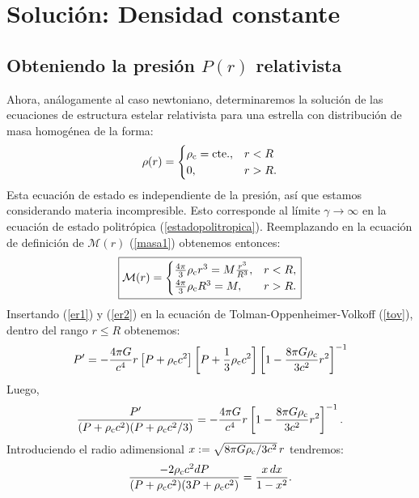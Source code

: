 \section{Solución: Densidad constante}

\subsection{Obteniendo la presión  \texorpdfstring{$P(r)$}{P(r)} relativista}
Ahora, análogamente al caso newtoniano, determinaremos la solución de las ecuaciones de estructura estelar relativista para una estrella con distribución de masa homogénea de la forma:
\begin{equation}\label{er1}
 \rho(r)=\begin{cases}
  \rho_{\rm c}=\text{cte.}, & r<R\\
  0, & r>R.
\end{cases}
\end{equation}
Esta ecuación de estado es independiente de la presión, así que estamos considerando materia incompresible. Esto corresponde al límite $\gamma\rightarrow\infty$ en la ecuación de estado politrópica (\ref{estadopolitropica}). Reemplazando en la ecuación de definición de $\mathcal{M}(r)$ (\ref{masa1}) obtenemos entonces:
\begin{equation}\label{er2}
\boxed{\mathcal{M}(r)=\begin{cases}
\frac{4\pi}{3}\rho_{\rm c}r^3=M\frac{r^3}{R^3}, &r<R,\\
\frac{4\pi}{3}\rho_{\rm c}R^3=M,  & r > R.
\end{cases}}
\end{equation}
Insertando (\ref{er1}) y (\ref{er2}) en la ecuación de Tolman-Oppenheimer-Volkoff (\ref{tov}), dentro del rango $r\leq R$ obtenemos:
\begin{align}
 P'=-\frac{4\pi G}{c^4}r\left[P+\rho_{\rm c} c^2\right]\left[P+\frac{1}{3}\rho_{\rm c}c^2\right]\left[ 1-\frac{8\pi G\rho_{\rm c}}{3c^2}r^2\right]^{-1}
\end{align}
Luego,
\begin{equation}\label{densidadcte1}
\frac{P'}{(P+\rho_{\rm c}c^2)(P+\rho_{\rm c}c^2/3)}=-\frac{4\pi G}{c^{4}}r\left[ 1-\frac{8\pi G\rho_{\rm c}}{3c^2}r^2\right]^{-1}.
\end{equation}
Introduciendo el radio adimensional $x:=\sqrt{8\pi G\rho_{\rm c}/3c^2}\,r$ tendremos:
\begin{equation}
\frac{-2\rho_{\rm c}c^2dP}{(P+\rho_{\rm c}c^2)(3P+\rho_{\rm c}c^2)}=\frac{x\,dx}{1-x^2}.
\end{equation}
